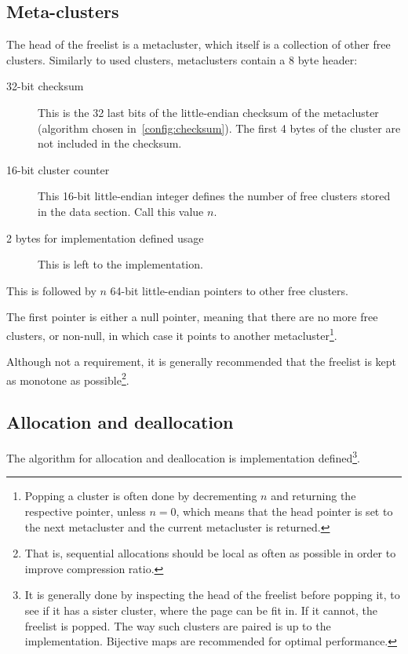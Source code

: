 \documentclass[11pt,a4paper]{report}
\begin{document}
        \subsection{Meta-clusters}
        \label{cluster:metacluster}
        The head of the freelist is a metacluster, which itself is a collection
        of other free clusters. Similarly to used clusters, metaclusters
        contain a 8 byte header:

        \begin{description}
            \item [32-bit checksum] This is the 32 last bits of the
                little-endian checksum of the metacluster (algorithm chosen
                in~\ref{config:checksum}). The first 4 bytes of the cluster are
                not included in the checksum.
            \item [16-bit cluster counter] This 16-bit little-endian integer
                defines the number of free clusters stored in the data section.
                Call this value $n$.
            \item [2 bytes for implementation defined usage] This is
                left to the implementation.
        \end{description}

        This is followed by $n$ 64-bit little-endian pointers to other free
        clusters.

        The first pointer is either a null pointer, meaning that there are no
        more free clusters, or non-null, in which case it points to another
        metacluster\footnote{Popping a cluster is often done by decrementing
        $n$ and returning the respective pointer, unless $n = 0$, which means
        that the head pointer is set to the next metacluster and the current
        metacluster is returned.}.

        Although not a requirement, it is generally recommended that
        the freelist is kept as monotone as possible\footnote{That is,
        sequential allocations should be local as often as possible in
        order to improve compression ratio.}.

        \subsection{Allocation and deallocation}
        The algorithm for allocation and deallocation is implementation
        defined\footnote{It is generally done by inspecting the head of the
            freelist before popping it, to see if it has a sister cluster,
            where the page can be fit in. If it cannot, the freelist is popped.
            The way such clusters are paired is up to the implementation.
            Bijective maps are recommended for optimal performance.}.
\end{document}
